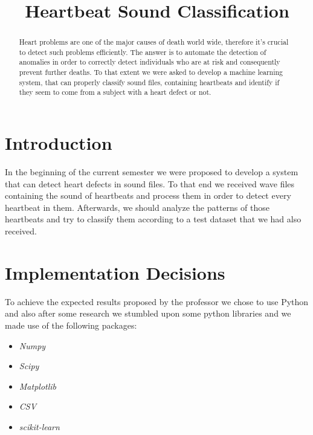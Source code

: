 \documentclass[conference]{IEEEtran}
\begin{document}
\title{Heartbeat Sound Classification}

\author{
\and
{}
\and
{}
}

\maketitle

\begin{abstract}
Heart problems are one of the major causes of death world wide, therefore it's
crucial to detect such problems efficiently. The answer is to automate the
detection of anomalies in order to correctly detect individuals who are at risk
and consequently prevent further deaths. To that extent we were asked to develop
a machine learning system, that can properly classify sound files, containing
heartbeats and identify if they seem to come from a subject with a heart defect
or not.
\end{abstract}

\IEEEpeerreviewmaketitle

\section{Introduction}
In the beginning of the current semester we were proposed to develop a system
that can detect heart defects in sound files. To that end we received
\acrfull{wave} files containing the sound of heartbeats and process them in
order to detect every heartbeat in them. Afterwards, we should analyze the
patterns of those heartbeats and try to classify them according to a test
dataset that we had also received.

\section{Implementation Decisions}
To achieve the expected results proposed by the professor we chose to use Python
and also after some research we stumbled upon some python libraries and we made
use of the following packages:
\begin{itemize}
	\item \textit{Numpy}
	\item \textit{Scipy}
	\item \textit{Matplotlib}
	\item \textit{CSV}
	\item \textit{scikit-learn}
\end{itemize}
\end{document}
